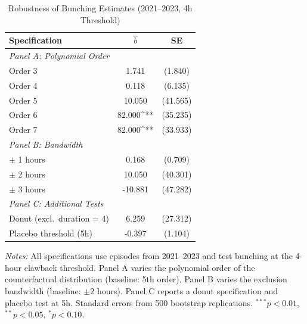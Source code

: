 \begin{table}[t]
\centering
\caption{Robustness of Bunching Estimates (2021--2023, 4h Threshold)}
\label{tab:robustness}
\begin{tabular}{lcc}
\hline\hline
Specification & $\hat{b}$ & SE \\
\hline
\multicolumn{3}{l}{\textit{Panel A: Polynomial Order}} \\
\quad Order 3 & 1.741 & (1.840) \\
\quad Order 4 & 0.118 & (6.135) \\
\quad Order 5 & 10.050 & (41.565) \\
\quad Order 6 & 82.000^{**} & (35.235) \\
\quad Order 7 & 82.000^{**} & (33.933) \\
\hline
\multicolumn{3}{l}{\textit{Panel B: Bandwidth}} \\
\quad $\pm$ 1 hours & 0.168 & (0.709) \\
\quad $\pm$ 2 hours & 10.050 & (40.301) \\
\quad $\pm$ 3 hours & -10.881 & (47.282) \\
\hline
\multicolumn{3}{l}{\textit{Panel C: Additional Tests}} \\
\quad Donut (excl.\ duration = 4) & 6.259 & (27.312) \\
\quad Placebo threshold (5h) & -0.397 & (1.104) \\
\hline\hline
\end{tabular}
\begin{tablenotes}[flushleft]
\footnotesize
\item \textit{Notes:} All specifications use episodes from 2021--2023 and test bunching at the 4-hour clawback threshold. Panel A varies the polynomial order of the counterfactual distribution (baseline: 5th order). Panel B varies the exclusion bandwidth (baseline: $\pm 2$ hours). Panel C reports a donut specification and placebo test at 5h. Standard errors from 500 bootstrap replications. $^{***}p<0.01$, $^{**}p<0.05$, $^{*}p<0.10$.
\end{tablenotes}
\end{table}
